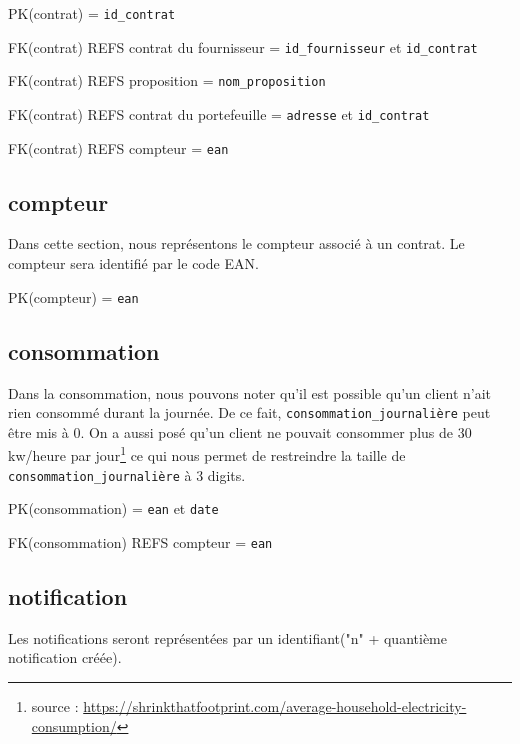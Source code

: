 \begin{flushleft}
PK(contrat) = \texttt{id\_contrat}
\end{flushleft}

\begin{flushleft}
FK(contrat) REFS contrat du fournisseur = \texttt{id\_fournisseur} et \texttt{id\_contrat}

FK(contrat) REFS proposition = \texttt{nom\_proposition}

FK(contrat) REFS contrat du portefeuille = \texttt{adresse} et \texttt{id\_contrat}

FK(contrat) REFS compteur = \texttt{ean}
\end{flushleft}
\newpage
\subsection{compteur}
\begin{flushleft}
Dans cette section, nous représentons le compteur associé à un contrat. Le compteur sera identifié par le code EAN. 
\end{flushleft}

\begin{flushleft}
PK(compteur) = \texttt{ean}
\end{flushleft}
\subsection{consommation}
\begin{flushleft}
Dans la consommation, nous pouvons noter qu'il est possible qu'un client n'ait rien consommé durant la journée. De ce fait, \texttt{consommation\_journalière} peut être mis à 0. On a aussi posé qu'un
client ne pouvait consommer plus de 30 kw/heure par jour\footnote{source : \url{https://shrinkthatfootprint.com/average-household-electricity-consumption/}} ce qui nous permet de restreindre la taille de \texttt{consommation\_journalière} à 3 digits.
\end{flushleft}

\begin{flushleft}
PK(consommation) = \texttt{ean} et \texttt{date}
\end{flushleft}

\begin{flushleft}
FK(consommation) REFS compteur = \texttt{ean}
\end{flushleft}

\subsection{notification}
\begin{flushleft}
Les notifications seront représentées par un identifiant("n" + quantième notification créée).
\end{flushleft}


